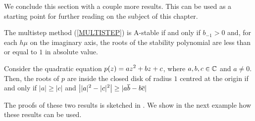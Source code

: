We conclude this section with a couple more results.  This can be used
as a starting point for further reading on the subject of this chapter.

\begin{prop}
The multistep method (\ref{MULTISTEP}) is A-stable if and only if
$b_{-1}>0$ and, for each $h\mu$ on the imaginary axis, the roots
of the stability polynomial are less than or equal to $1$ in absolute value.
\label{Cond_A-stab}
\end{prop}

\begin{lemma}
Consider the quadratic equation $\displaystyle p(z) = az^2+bz+c$,
where $a,b,c \in \mathbb{C}$ and $a\not=0$.  Then, the roots of $p$ are
inside the closed disk of radius $1$ centred at the origin if and only if
$|a| \geq|c|$ and
$\displaystyle \big| |a|^2-|c|^2\big| \geq |a\overline{b}-b\overline{c}|$
\label{CSCrit}
\end{lemma}

The proofs of these two results is sketched in \cite{I}.  We show in the next
example how these results can be used.

